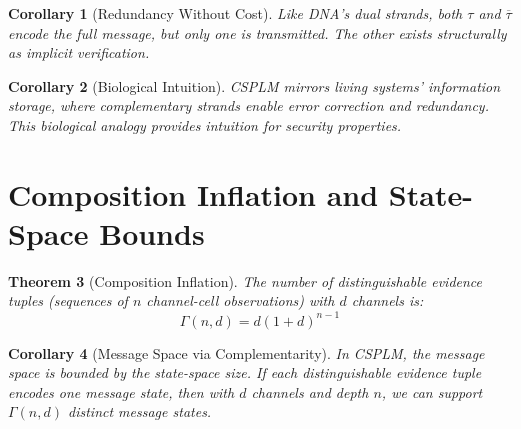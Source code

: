 \documentclass[twocolumn,10pt,a4paper]{article}
\theoremstyle{plain}
\newtheorem{theorem}{Theorem}[section]
\newtheorem{corollary}[theorem]{Corollary}
\theoremstyle{definition}
\newcommand{\comp}[1]{\overline{#1}}
\begin{document}
\begin{corollary}[Redundancy Without Cost]
Like DNA's dual strands, both $\tau$ and $\comp{\tau}$ encode the full message, but only one is transmitted. The other exists structurally as implicit verification.
\end{corollary}

\begin{corollary}[Biological Intuition]
CSPLM mirrors living systems' information storage, where complementary strands enable error correction and redundancy. This biological analogy provides intuition for security properties.
\end{corollary}

\section{Composition Inflation and State-Space Bounds}

\begin{theorem}[Composition Inflation]
The number of distinguishable evidence tuples (sequences of $n$ channel-cell observations) with $d$ channels is:
\[
\Gamma(n, d) = d(1 + d)^{n-1}
\]
\end{theorem}

\begin{corollary}[Message Space via Complementarity]
\label{cor:msgspace}
In CSPLM, the message space is bounded by the state-space size. If each distinguishable evidence tuple encodes one message state, then with $d$ channels and depth $n$, we can support $\Gamma(n, d)$ distinct message states.
\end{corollary}
\end{document}
